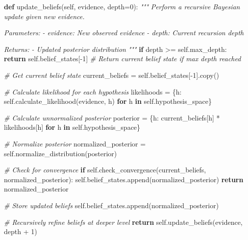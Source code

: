 \documentclass[
]{article}
\newenvironment{Shaded}{}{}
\newcommand{\CommentTok}[1]{\textcolor[rgb]{0.38,0.63,0.69}{\textit{#1}}}
\newcommand{\ControlFlowTok}[1]{\textcolor[rgb]{0.00,0.44,0.13}{\textbf{#1}}}
\newcommand{\DecValTok}[1]{\textcolor[rgb]{0.25,0.63,0.44}{#1}}
\newcommand{\KeywordTok}[1]{\textcolor[rgb]{0.00,0.44,0.13}{\textbf{#1}}}
\newcommand{\NormalTok}[1]{#1}
\newcommand{\OperatorTok}[1]{\textcolor[rgb]{0.40,0.40,0.40}{#1}}
\newcommand{\VariableTok}[1]{\textcolor[rgb]{0.10,0.09,0.49}{#1}}
\begin{document}
\begin{Shaded}
\begin{Highlighting}[]
    \KeywordTok{def}\NormalTok{ update\_beliefs(}\VariableTok{self}\NormalTok{, evidence, depth}\OperatorTok{=}\DecValTok{0}\NormalTok{):}
        \CommentTok{"""}
\CommentTok{        Perform a recursive Bayesian update given new evidence.}

\CommentTok{        Parameters:}
\CommentTok{        {-} evidence: New observed evidence}
\CommentTok{        {-} depth: Current recursion depth}

\CommentTok{        Returns:}
\CommentTok{        {-} Updated posterior distribution}
\CommentTok{        """}
        \ControlFlowTok{if}\NormalTok{ depth }\OperatorTok{\textgreater{}=} \VariableTok{self}\NormalTok{.max\_depth:}
            \ControlFlowTok{return} \VariableTok{self}\NormalTok{.belief\_states[}\OperatorTok{{-}}\DecValTok{1}\NormalTok{]  }\CommentTok{\# Return current belief state if max depth reached}

        \CommentTok{\# Get current belief state}
\NormalTok{        current\_beliefs }\OperatorTok{=} \VariableTok{self}\NormalTok{.belief\_states[}\OperatorTok{{-}}\DecValTok{1}\NormalTok{].copy()}

        \CommentTok{\# Calculate likelihood for each hypothesis}
\NormalTok{        likelihoods }\OperatorTok{=}\NormalTok{ \{h: }\VariableTok{self}\NormalTok{.calculate\_likelihood(evidence, h) }\ControlFlowTok{for}\NormalTok{ h }\KeywordTok{in} \VariableTok{self}\NormalTok{.hypothesis\_space\}}

        \CommentTok{\# Calculate unnormalized posterior}
\NormalTok{        posterior }\OperatorTok{=}\NormalTok{ \{h: current\_beliefs[h] }\OperatorTok{*}\NormalTok{ likelihoods[h] }\ControlFlowTok{for}\NormalTok{ h }\KeywordTok{in} \VariableTok{self}\NormalTok{.hypothesis\_space\}}

        \CommentTok{\# Normalize posterior}
\NormalTok{        normalized\_posterior }\OperatorTok{=} \VariableTok{self}\NormalTok{.normalize\_distribution(posterior)}

        \CommentTok{\# Check for convergence}
        \ControlFlowTok{if} \VariableTok{self}\NormalTok{.check\_convergence(current\_beliefs, normalized\_posterior):}
            \VariableTok{self}\NormalTok{.belief\_states.append(normalized\_posterior)}
            \ControlFlowTok{return}\NormalTok{ normalized\_posterior}

        \CommentTok{\# Store updated beliefs}
        \VariableTok{self}\NormalTok{.belief\_states.append(normalized\_posterior)}

        \CommentTok{\# Recursively refine beliefs at deeper level}
        \ControlFlowTok{return} \VariableTok{self}\NormalTok{.update\_beliefs(evidence, depth }\OperatorTok{+} \DecValTok{1}\NormalTok{)}


\end{Highlighting}
\end{Shaded}
\end{document}
